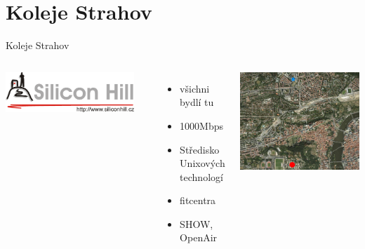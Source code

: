 \documentclass{beamer}
\begin{document}
\section{Koleje Strahov}
\begin{frame}{Koleje Strahov}
	\begin{columns}[c]
			\begin{center}
				\includegraphics[width=0.9\textwidth]{logo_sh.png}
			\end{center}

			\begin{itemize}
				\item všichni bydlí tu
				\item 1000Mbps
				\item Středisko Unixových technologí
				\item fitcentra
				\item SHOW, OpenAir
			\end{itemize}
			\begin{center}
				\includegraphics[width=\textwidth]{mapa_sh.png}
			\end{center}
	\end{columns}

\end{frame}
\end{document}
